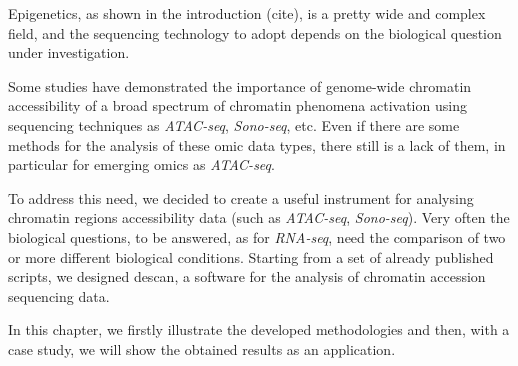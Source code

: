 
Epigenetics, as shown in the introduction (cite), is a pretty wide and complex field, and the sequencing technology to adopt depends on the biological question under investigation.

Some studies \cite{Koberstein2018, Auerbach2009} have demonstrated the importance of genome-wide chromatin accessibility of a broad spectrum of chromatin phenomena activation using sequencing techniques as \textit{ATAC-seq}, \textit{Sono-seq}, etc.
Even if there are some methods for the analysis of these omic data types, there still is a lack of them, in particular for emerging omics as \textit{ATAC-seq}.

To address this need, we decided to create a useful instrument for analysing chromatin regions accessibility data (such as \textit{ATAC-seq}, \textit{Sono-seq}).
Very often the biological questions, to be answered, as for \textit{RNA-seq}, need the comparison of two or more different biological conditions.
Starting from a set of already published \cite{Koberstein2018} scripts, we designed \gls{descan}, a software for the analysis of chromatin accession sequencing data.

In this chapter, we firstly illustrate the developed methodologies and then, with a case study, we will show the obtained results as an application.